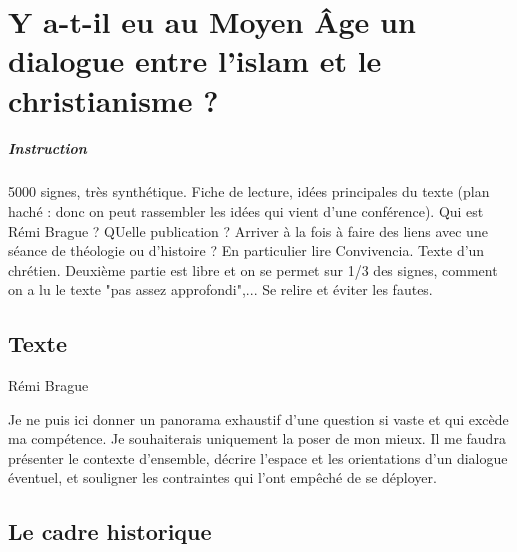 \chapter{Y a-t-il eu au Moyen Âge un dialogue
entre l’islam et le christianisme ?}


\paragraph{Instruction} 5000 signes, très synthétique. Fiche de lecture, idées principales du texte (plan haché : donc on peut rassembler les idées qui vient d'une conférence). Qui est Rémi Brague ? QUelle publication ? Arriver à la fois à faire des liens avec une séance de théologie ou d'histoire ?  En particulier lire Convivencia. Texte d'un chrétien. Deuxième partie est libre et on se permet sur 1/3 des signes, comment on a lu le texte "pas assez approfondi",... Se relire et éviter les fautes. 



\section{Texte}
Rémi Brague

Je ne puis ici donner un panorama exhaustif d'une question si vaste et qui excède ma compétence. Je souhaiterais uniquement la poser de mon mieux. Il me faudra présenter le contexte d'ensemble, décrire l'espace et les orientations d'un dialogue éventuel, et souligner les contraintes qui l'ont empêché de se déployer.

\section{Le cadre historique}

